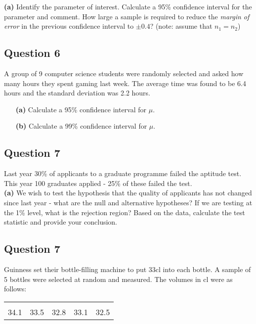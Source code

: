 	{\bf(a)} Identify the parameter of interest.  Calculate a 95\% confidence interval for the parameter and comment.  How large a sample is required to reduce the \emph{margin of error} in the previous confidence interval to $\pm 0.4$? (note: assume that $n_1 = n_2$)
	
	

	
\subsection*{Question 6}
A group of 9 computer science students were randomly selected and asked how many hours they spent gaming last week. The average time was found to be 6.4 hours and the standard deviation was 2.2 hours.
\begin{itemize}
	\item[{\bf(a)}] Calculate a 95\% confidence interval for $\mu$. \item[{\bf(b)}] Calculate a 99\% confidence interval for $\mu$.
\end{itemize}






\subsection*{Question 7}
Last year 30\% of applicants to a graduate programme failed the aptitude test. This year 100 graduates applied - 25\% of these failed the test.\\[-0.2cm]

{\bf(a)} We wish to test the hypothesis that the quality of applicants has not changed since last year - what are the null and alternative hypotheses?  If we are testing at the 1\% level, what is the rejection region?  Based on the data, calculate the test statistic and provide your conclusion.





\subsection*{Question 7}
Guinness set their bottle-filling machine to put 33cl into each bottle. A sample of 5 bottles were selected at random and measured. The volumes in cl were as follows:\\[-0.2cm]
\begin{center}
	\begin{tabular}{|ccccc|}
		\hline
		&&&&\\[-0.3cm]
		34.1  & 33.5 & 32.8 & 33.1 & 32.5\\[0.1cm]
		\hline
	\end{tabular}
\end{center}


